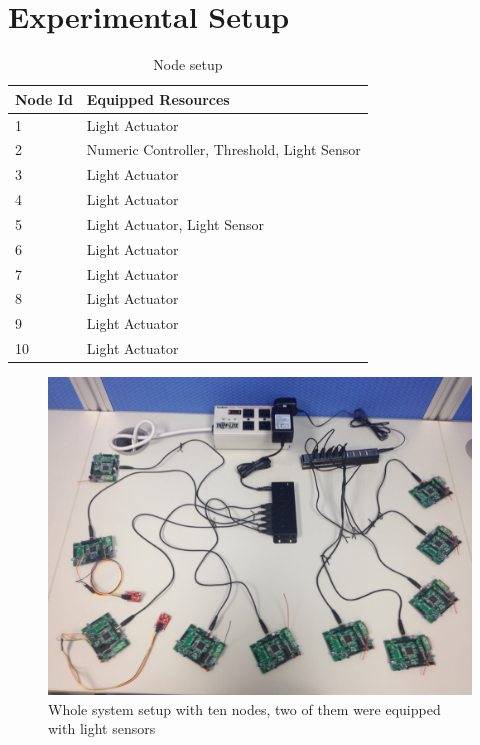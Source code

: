 \section{Experimental Setup}


\begin{table}
\centering
\caption{Node setup}
\label{tbl:setup}
  \begin{tabular}{|l|l|}
  \hline
  \textbf{Node Id} & \textbf{Equipped Resources} \\
  \hline
  1 & Light Actuator \\
  \hline
  2 & Numeric Controller, Threshold, Light Sensor \\
  \hline
  3 & Light Actuator \\
  \hline
  4 & Light Actuator \\
  \hline
  5 & Light Actuator, Light Sensor \\
  \hline
  6 & Light Actuator \\
  \hline
  7 & Light Actuator \\
  \hline
  8 & Light Actuator \\
  \hline
  9 & Light Actuator \\
  \hline
  10 & Light Actuator \\
  \hline
  \end{tabular}
\end{table}

\begin{figure}[h!]
  \centering
    \includegraphics[width=\linewidth]{figures/system-setup}
    \caption{Whole system setup with ten nodes, two of them were equipped with light sensors}
  \label{fig:system-setup}
\end{figure}

